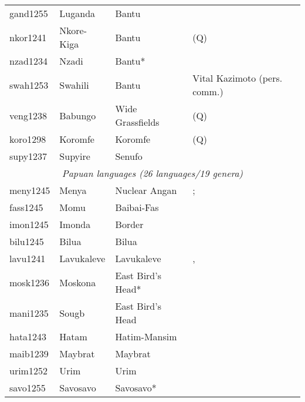 \documentclass[A4paper]{article}
\begin{document}
\begin{longtable}{p{.11\linewidth}p{.2\linewidth}p{.24\linewidth}p{.35\linewidth}}
gand1255	& Luganda 		& Bantu 	& \citealt[102]{ashtonetal1954}\\
nkor1241	& Nkore-Kiga 		& Bantu 	& (Q) \citealp[131]{taylor1985}\\
nzad1234	& Nzadi			& Bantu*	& \citealp[210, 279]{craneetal2011}\\
swah1253	& Swahili 		& Bantu 	& Vital Kazimoto (pers. comm.)\\
veng1238	& Babungo 		& Wide Grassfields & (Q) \citealp[197f.]{schaub1985}\\
koro1298	& Koromfe 		& Koromfe 	& (Q) \citealp[242, 250f.]{rennison1997}\\
supy1237	& Supyire 		& Senufo 	& \citealp[207f.]{carlson1994}\\
\midrule
\multicolumn{4}{c}{{\emph{Papuan languages (26 languages/19 genera)}}}\\
\midrule
meny1245	& Menya		& Nuclear Angan		& \citealp[40, 46, 56f.]{whitehead2006}; \citealp[9f., 18f.]{whitehead2013}\\
fass1245	& Momu		& Baibai-Fas	 	& \citealp[169f., 242, 568]{honeyman2016}\\
imon1245	& Imonda 	& Border	 	& \citealp[44, 61f.]{seiler1985}\\
bilu1245	& Bilua 	& Bilua 		& \citealp[47--49, 76, 79, 84f., 87--89, 92f.]{obata2003}\\
lavu1241	& Lavukaleve 	& Lavukaleve 		& \citealp[171--173]{terrill2003}, \citealp[435, (27)]{terrill2004}\\
mosk1236	& Moskona	& East Bird's Head* 	& \citealp[91, 222--224, 344]{gravelle2010}\\
mani1235	& Sougb		& East Bird's Head	& \citealp[200, 269f., 274]{reesink2002sougb}\\
hata1243	& Hatam		& Hatim-Mansim		& \citealp[195]{reesink1999}\\
maib1239	& Maybrat	& Maybrat		& \citealp[141, 158, 172, (281)]{dol2007}\\
urim1252	& Urim		& Urim			& \citealp[123, 125]{hemmilaeluoma1987}\\
savo1255	& Savosavo	& Savosavo*		& \citealp[147,155--159]{wegener2012}\\

\end{longtable}
\end{document}
